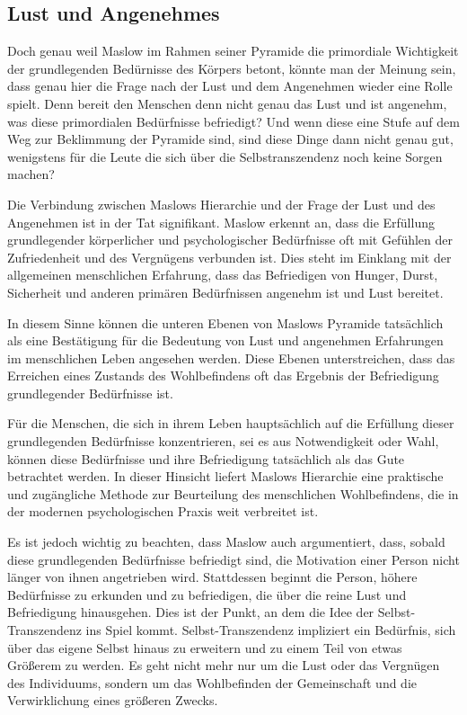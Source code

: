 \documentclass[12pt,a4paper]{article}
\begin{document}
\subsection[short]{Lust und Angenehmes}
Doch genau weil Maslow im Rahmen seiner Pyramide die primordiale Wichtigkeit der grundlegenden Bedürnisse des Körpers betont, könnte man der Meinung sein, dass genau hier die Frage nach der Lust und dem Angenehmen wieder eine Rolle spielt. Denn bereit den Menschen denn nicht genau das Lust und ist angenehm, was diese primordialen Bedürfnisse befriedigt? Und wenn diese eine Stufe auf dem Weg zur Beklimmung der Pyramide sind, sind diese Dinge dann nicht genau gut, wenigstens für die Leute die sich über die Selbstranszendenz noch keine Sorgen machen?

Die Verbindung zwischen Maslows Hierarchie und der Frage der Lust und des Angenehmen ist in der Tat signifikant. Maslow erkennt an, dass die Erfüllung grundlegender körperlicher und psychologischer Bedürfnisse oft mit Gefühlen der Zufriedenheit und des Vergnügens verbunden ist. Dies steht im Einklang mit der allgemeinen menschlichen Erfahrung, dass das Befriedigen von Hunger, Durst, Sicherheit und anderen primären Bedürfnissen angenehm ist und Lust bereitet.

In diesem Sinne können die unteren Ebenen von Maslows Pyramide tatsächlich als eine Bestätigung für die Bedeutung von Lust und angenehmen Erfahrungen im menschlichen Leben angesehen werden. Diese Ebenen unterstreichen, dass das Erreichen eines Zustands des Wohlbefindens oft das Ergebnis der Befriedigung grundlegender Bedürfnisse ist.

Für die Menschen, die sich in ihrem Leben hauptsächlich auf die Erfüllung dieser grundlegenden Bedürfnisse konzentrieren, sei es aus Notwendigkeit oder Wahl, können diese Bedürfnisse und ihre Befriedigung tatsächlich als das Gute betrachtet werden. In dieser Hinsicht liefert Maslows Hierarchie eine praktische und zugängliche Methode zur Beurteilung des menschlichen Wohlbefindens, die in der modernen psychologischen Praxis weit verbreitet ist.

Es ist jedoch wichtig zu beachten, dass Maslow auch argumentiert, dass, sobald diese grundlegenden Bedürfnisse befriedigt sind, die Motivation einer Person nicht länger von ihnen angetrieben wird. Stattdessen beginnt die Person, höhere Bedürfnisse zu erkunden und zu befriedigen, die über die reine Lust und Befriedigung hinausgehen. Dies ist der Punkt, an dem die Idee der Selbst-Transzendenz ins Spiel kommt. Selbst-Transzendenz impliziert ein Bedürfnis, sich über das eigene Selbst hinaus zu erweitern und zu einem Teil von etwas Größerem zu werden. Es geht nicht mehr nur um die Lust oder das Vergnügen des Individuums, sondern um das Wohlbefinden der Gemeinschaft und die Verwirklichung eines größeren Zwecks.
\end{document}
